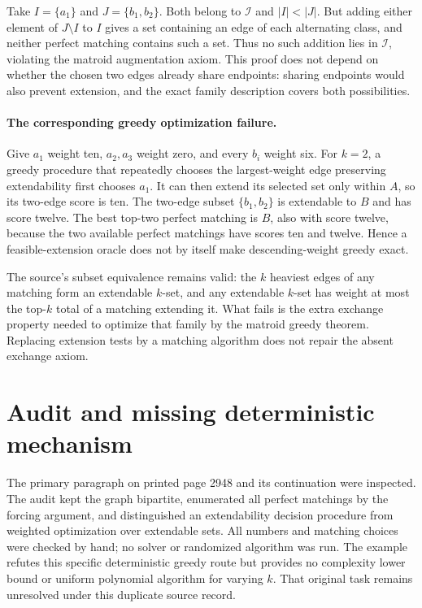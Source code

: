 \documentclass[11pt]{article}
\begin{document}
Take $I=\{a_1\}$ and $J=\{b_1,b_2\}$.
Both belong to $\mathcal I$ and $|I|<|J|$. But adding
either element of $J\setminus I$ to $I$ gives a set
containing an edge of each alternating class, and neither perfect
matching contains such a set. Thus no such addition lies in
$\mathcal I$, violating the matroid augmentation axiom.
This proof does not depend on whether the chosen two edges
already share endpoints: sharing endpoints would also prevent
extension, and the exact family description covers both possibilities.

\paragraph{The corresponding greedy optimization failure.}
Give $a_1$ weight ten, $a_2,a_3$ weight zero, and every
$b_i$ weight six. For $k=2$, a greedy procedure that
repeatedly chooses the largest-weight edge preserving extendability
first chooses $a_1$. It can then extend its selected set
only within $A$, so its two-edge score is ten. The two-edge
subset $\{b_1,b_2\}$ is extendable to $B$ and has score
twelve. The best top-two perfect matching is $B$, also with
score twelve, because the two available perfect matchings have
scores ten and twelve. Hence a feasible-extension oracle does not
by itself make descending-weight greedy exact.

The source's subset equivalence remains valid: the $k$ heaviest
edges of any matching form an extendable $k$-set, and any
extendable $k$-set has weight at most the top-$k$ total
of a matching extending it. What fails is the extra exchange
property needed to optimize that family by the matroid greedy
theorem. Replacing extension tests by a matching algorithm does
not repair the absent exchange axiom.

\section{Audit and missing deterministic mechanism}
The primary paragraph on printed page 2948 and its continuation
were inspected. The audit kept the graph bipartite, enumerated all
perfect matchings by the forcing argument, and distinguished an
extendability decision procedure from weighted optimization over
extendable sets. All numbers and matching choices were checked by
hand; no solver or randomized algorithm was run. The example
refutes this specific deterministic greedy route but provides no
complexity lower bound or uniform polynomial algorithm for varying
$k$. That original task remains unresolved under this duplicate
source record.
\end{document}
